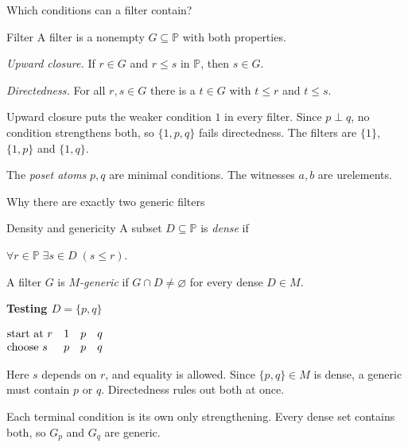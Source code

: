 \documentclass[aspectratio=169,11pt]{beamer}
\begin{document}
\begin{frame}[t]{Which conditions can a filter contain?}
\begin{ACcolumns}
\ACdiagramcolumn
\centering{}
\ACtextcolumn
\begin{block}{Filter}
A filter is a nonempty $G\subseteq\mathbb P$ with both properties.
\par\smallskip
\emph{Upward closure.} If $r\in G$ and $r\le s$ in $\mathbb P$, then $s\in G$.
\par\smallskip
\emph{Directedness.} For all $r,s\in G$ there is a $t\in G$ with $t\le r$ and $t\le s$.
\end{block}
\end{ACcolumns}
\smallskip\par
Upward closure puts the weaker condition $1$ in every filter. Since $p\perp q$, no condition strengthens both, so $\{1,p,q\}$ fails directedness. The filters are $\{1\}$, $\{1,p\}$ and $\{1,q\}$.
\smallskip\par
The \emph{poset atoms} $p,q$ are minimal conditions. The witnesses $a,b$ are urelements.
\end{frame}

\begin{frame}[t]{Why there are exactly two generic filters}
\begin{ACcolumns}
\ACdiagramcolumn
\centering{}
\ACtextcolumn
\begin{block}{Density and genericity}
A subset $D\subseteq\mathbb P$ is \emph{dense} if
\par\smallskip
\centerline{$\forall r\in\mathbb P\;\exists s\in D\;(s\le r).$}
\par\smallskip
A filter $G$ is \emph{$M$-generic} if $G\cap D\ne\varnothing$ for every dense $D\in M$.
\end{block}
\end{ACcolumns}
\medskip\par
\begin{ACcolumns}
\ACdiagramcolumn
\textbf{Testing $D=\{p,q\}$}\par\smallskip
$\begin{array}{@{}l@{\quad}ccc}
\text{start at }r & 1 & p & q\\
\text{choose }s & p & p & q
\end{array}$\par\smallskip
Here $s$ depends on $r$, and equality is allowed.
\ACtextcolumn
Since $\{p,q\}\in M$ is dense, a generic must contain $p$ or $q$. Directedness rules out both at once.
\smallskip\par
Each terminal condition is its own only strengthening. Every dense set contains both, so $G_p$ and $G_q$ are generic.
\end{ACcolumns}
\end{frame}
\end{document}
